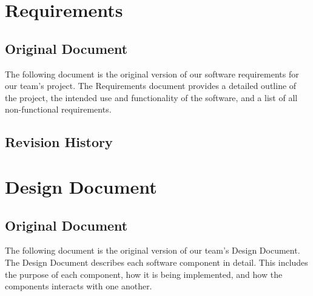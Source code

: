 \documentclass[10pt,letterpaper,onecolumn,draftclsnofoot,journal]{IEEEtran}
\begin{document}
\section{\textbf{Requirements}}
\subsection{\textbf{Original Document}}
The following document is the original version of our software requirements for our team's project. The Requirements document provides a detailed outline of the project, the intended use and functionality of the software, and a list of all non-functional requirements.     


\subsection{\textbf{Revision History}}



\section{\textbf{Design Document}}
\subsection{\textbf{Original Document}}
The following document is the original version of our team's Design Document. The Design Document describes each software component in detail. This includes the purpose of each component, how it is being implemented, and how the components interacts with one another.    

\end{document}
